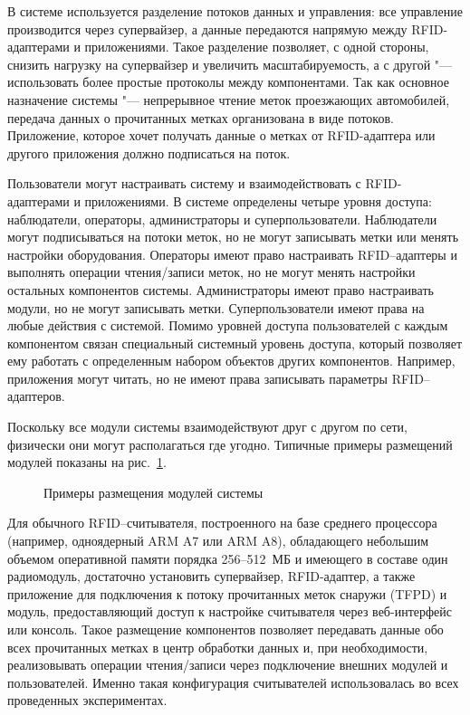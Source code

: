 В системе используется разделение потоков данных и управления: все управление производится через супервайзер, а данные передаются напрямую между RFID-адаптерами и приложениями. Такое разделение позволяет, с одной стороны, снизить нагрузку на супервайзер и увеличить масштабируемость, а с другой "--- использовать более простые протоколы между компонентами. Так как основное назначение системы "--- непрерывное чтение меток проезжающих автомобилей, передача данных о прочитанных метках организована в виде потоков. Приложение, которое хочет получать данные о метках от RFID-адаптера или другого приложения должно подписаться на поток.

Пользователи могут настраивать систему и взаимодействовать с RFID-адаптерами и приложениями. В системе определены четыре уровня доступа: наблюдатели, операторы, администраторы и суперпользователи. Наблюдатели могут подписываться на потоки меток, но не могут записывать метки или менять настройки оборудования. Операторы имеют право настраивать RFID--адаптеры и выполнять операции чтения/записи меток, но не могут менять настройки остальных компонентов системы. Администраторы имеют право настраивать модули, но не могут записывать метки. Суперпользователи имеют права на любые действия с системой. Помимо уровней доступа пользователей с каждым компонентом связан специальный системный уровень доступа, который позволяет ему работать с определенным набором объектов других компонентов. Например, приложения могут читать, но не имеют права записывать параметры RFID--адаптеров.

Поскольку все модули системы взаимодействуют друг с другом по сети, физически они могут располагаться где угодно. Типичные примеры размещений модулей показаны на рис.~\ref{fig:ch5_deployments}.

\begin{figure}[ht]
  \caption{Примеры размещения модулей системы}
  \label{fig:ch5_deployments}
\end{figure}

Для обычного RFID--считывателя, построенного на базе среднего процессора (например, одноядерный ARM A7 или ARM A8), обладающего небольшим объемом оперативной памяти порядка 256--512~МБ и имеющего в составе один радиомодуль, достаточно установить супервайзер, RFID-адаптер, а также приложение для подключения к потоку прочитанных меток снаружи (TFPD) и модуль, предоставляющий доступ к настройке считывателя через веб-интерфейс или консоль. Такое размещение компонентов позволяет передавать данные обо всех прочитанных метках в центр обработки данных и, при необходимости, реализовывать операции чтения/записи через подключение внешних модулей и пользователей. Именно такая конфигурация считывателей использовалась во всех проведенных экспериментах.

